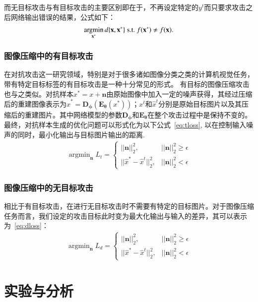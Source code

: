 \documentclass[macfonts,phd,oneside,nobackinfo]{njuthesis}
\begin{document}
而无目标攻击与有目标攻击的主要区别即在于，不再设定特定的$y^t$而只要求攻击之后网络输出错误的结果，公式如下：
\begin{align}
\mathop{\arg\!\min}_{{\bf x}^{\ast}} {d}\{{\bf x},{\bf x}^{\ast}\}  \ \text{s.t.} \ f({\bf x}^{\ast}) \neq f({\bf x}). \label{eq:untargeted_attack}
\end{align}

\subsection{图像压缩中的有目标攻击}
在对抗攻击这一研究领域，特别是对于很多诸如图像分类之类的计算机视觉任务，带有特定目标标签的有目标攻击是一种十分常见的形式。 有目标的图像压缩攻击也与之类似。对抗样本$x^*=x+\mathbf{n}$由原始图像中加入一定的噪声获得，其经过压缩后的重建图像表示为$\hat{x}^* = \mathbf{D_{\phi}}(\mathbf{E_{\theta}}(x^*))$；$x^t$和$\hat{x}^t$分别是原始目标图片以及其压缩后的重建图片。其中网络模型的参数$\mathbf{D_{\phi}}$和$\mathbf{E_{\theta}}$在整个攻击过程中是保持不变的。 最终，对抗样本生成的优化问题可以形式化为以下公式~\eqref{eq:tloss}, 以在控制输入噪声的同时，最小化输出与目标图片输出的距离. 
\begin{align}
    \mathop{\arg\min}_{\mathbf{n}}{L_{t}} =\left\{ \begin{array}{lc}
        ||\mathbf{n}||_2^2, & ||\mathbf{n}||_2^2 \geq \epsilon \\
        ||\hat{x}^{*}-\hat{x}^{t}||_2^2, & ||\mathbf{n}||_2^2 < \epsilon
    \end{array}
    \right.
    \label{eq:tloss}
\end{align}
\subsection{图像压缩中的无目标攻击}
相比于有目标攻击，在进行无目标攻击时不需要有特定的目标图片。对于图像压缩任务而言，我们设定的攻击目标此时变为最大化输出与输入的差异，其可以表示为~\eqref{eq:dloss}：
\begin{align}
    \mathop{\arg\min}_{\mathbf{n}}{L_{d}} =\left\{ \begin{array}{lc}
        ||\mathbf{n}||_2^2, & ||\mathbf{n}||_2^2 \geq \epsilon \\
        ||\hat{x}^{*}-\hat{x}^{t}||_2^2, & ||\mathbf{n}||_2^2 < \epsilon
    \end{array}
    \right.
    \label{eq:dloss}
\end{align}
\chapter{实验与分析}
\end{document}
